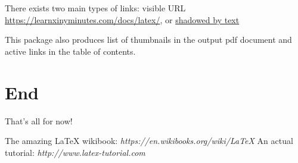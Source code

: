 \documentclass[12pt]{article}
\begin{document}
There exists two main types of links: visible URL \\
\url{https://learnxinyminutes.com/docs/latex/}, or  
\href{https://learnxinyminutes.com/docs/latex/}{shadowed by text}

This package also produces list of thumbnails in the output pdf document and 
active links in the table of contents.

\section{End}

That's all for now!

\begin{thebibliography}{1}
   The amazing \LaTeX \hspace{1pt} wikibook: {\em 
https://en.wikibooks.org/wiki/LaTeX}
   An actual tutorial: {\em http://www.latex-tutorial.com}
\end{thebibliography}

\end{document}
